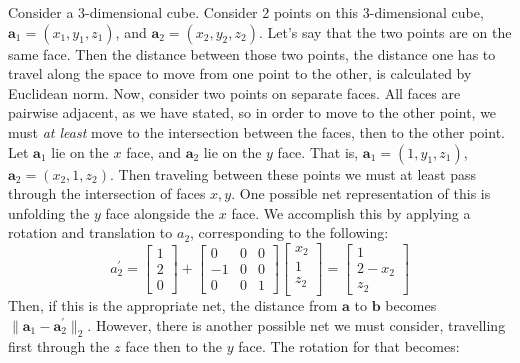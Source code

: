 Consider a 3-dimensional cube.  Consider 2 points on this 3-dimensional cube,
  $\bm{a}_1 = (x_1,y_1,z_1)$, and $\bm{a}_2 = (x_2,y_2,z_2)$. Let's say that the two points are
  on the same face.  Then the distance between those two points, the distance one has to travel
  along the space to move from one point to the other, is calculated by Euclidean norm.  Now,
  consider two points on separate faces.  All faces are pairwise adjacent, as we have stated, so
  in order to move to the other point, we must \emph{at least} move to the intersection between the
  faces, then to the other point.  Let $\bm{a}_1$ lie on the $x$ face, and $\bm{a}_2$ lie on the
  $y$ face.  That is, $\bm{a}_1 = (1, y_1, z_1)$, $\bm{a}_2 = (x_2, 1, z_2)$.  Then traveling
  between these points we must at least pass through the intersection of faces $x,y$.  One possible
  net representation of this is unfolding the $y$ face alongside the $x$ face.  We accomplish this
  by applying a rotation and translation to $a_2$, corresponding to the following:
  \begin{equation}
    \label{eq:1drotation}
    a_2^{\prime} = \begin{bmatrix}
    1 \\
    2 \\
    0
    \end{bmatrix}
    +
    \begin{bmatrix}
    0  & 0 & 0 \\
    -1 & 0 & 0 \\
    0  & 0 & 1
    \end{bmatrix}
    \begin{bmatrix}
    x_2 \\
    1 \\
    z_2 \\
    \end{bmatrix} = \begin{bmatrix}
    1 \\
    2 - x_2 \\
    z_2
    \end{bmatrix}
  \end{equation}
  Then, if this is the appropriate net, the distance from $\bm{a}$ to $\bm{b}$ becomes 
  $\lVert \bm{a}_1 - \bm{a}_2^{\prime}\rVert_2$. However, there
  is another possible net we must consider, travelling first through the $z$ face then to the 
  $y$ face.  The rotation for that becomes:
